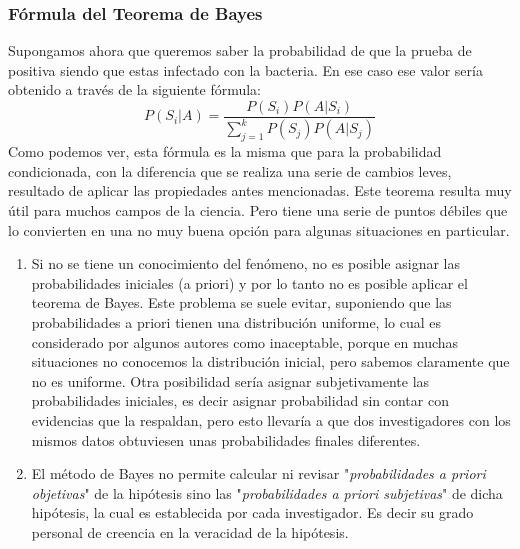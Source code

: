 \documentclass[]{article}
\begin{document}
\subsubsection*{Fórmula del Teorema de Bayes}
Supongamos ahora que queremos saber la probabilidad de que la prueba de positiva siendo que estas infectado con la bacteria. En ese caso ese valor sería obtenido a través de la siguiente fórmula:
\[ P(S_i|A)= \frac{P(S_i)P(A|S_i)}{\sum_{j=1}^k P(S_j)P(A|S_j)} \]
Como podemos ver, esta fórmula es la misma que para la probabilidad condicionada, con la diferencia que se realiza una serie de cambios leves, resultado de aplicar las propiedades antes mencionadas.
Este teorema resulta muy útil para muchos campos de la ciencia. Pero tiene una serie de puntos débiles que lo convierten en una no muy buena opción para algunas situaciones en particular.
\begin{enumerate}
	\item Si no se tiene un conocimiento del fenómeno, no es posible asignar las probabilidades iniciales (a priori) y por lo tanto no es posible aplicar el teorema de Bayes. Este problema se suele evitar, suponiendo que las probabilidades a priori tienen una distribución uniforme, lo cual es considerado por algunos autores como inaceptable, porque en muchas situaciones no conocemos la distribución inicial, pero sabemos claramente que no es uniforme. Otra posibilidad sería asignar subjetivamente las probabilidades iniciales, es decir asignar probabilidad sin contar con evidencias que la respaldan, pero esto llevaría a que dos investigadores con los mismos datos obtuviesen unas probabilidades finales diferentes.
	\item El método de Bayes no permite calcular ni revisar "\textit{probabilidades a priori objetivas}" de la hipótesis sino las "\textit{probabilidades a priori subjetivas}" de dicha hipótesis, la cual es establecida por cada investigador. Es decir su grado personal de creencia en la veracidad de la hipótesis.
\end{enumerate}
\end{document}
